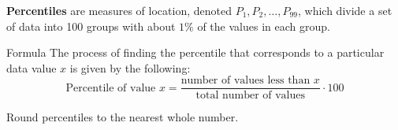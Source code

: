\documentclass{beamer}
\begin{document}
\begin{frame}
\begin{definition}
\textbf{Percentiles} are measures of location, denoted $P_{1},P_{2},\ldots,P_{99}$, which divide a set of data into 100 groups with about $1\%$ of the values in each group.
\end{definition}\pause

\begin{block}{Formula}
The process of finding the percentile that corresponds to a particular data value $x$ is given by the following:
\begin{equation*}
\text{Percentile of value $x$} = \dfrac{\text{number of values less than $x$}}{\text{total number of values}}\cdot 100
\end{equation*}
\end{block}\pause

\begin{note}
Round percentiles to the nearest whole number.
\end{note}
\end{frame}
\end{document}

